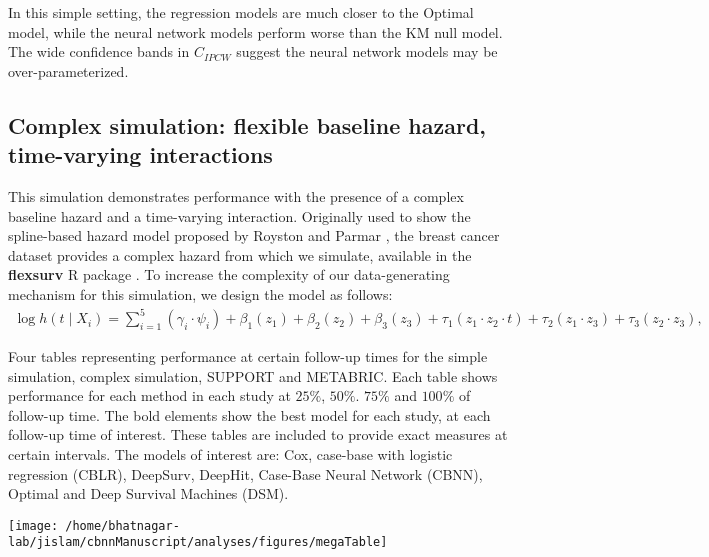 \documentclass[AMA,STIX1COL,]{WileyNJD-v2}
\begin{document}
In this simple setting, the regression models are much closer to the
Optimal model, while the neural network models perform worse than the KM
null model. The wide confidence bands in \(C_{IPCW}\) suggest the neural
network models may be over-parameterized.

\hypertarget{complex-simulation-flexible-baseline-hazard-time-varying-interactions}{%
\subsection{Complex simulation: flexible baseline hazard, time-varying
interactions}\label{complex-simulation-flexible-baseline-hazard-time-varying-interactions}}

This simulation demonstrates performance with the presence of a complex
baseline hazard and a time-varying interaction. Originally used to show
the spline-based hazard model proposed by Royston and Parmar
\citep{royston2002flexible}, the breast cancer dataset provides a
complex hazard from which we simulate, available in the
\textbf{flexsurv} R package \citep{flexsurv}. To increase the complexity
of our data-generating mechanism for this simulation, we design the
model as follows: \begin{align}
\log h(t \mid X_i) =\sum_{i=1}^{5} (\gamma_{i} \cdot \psi_{i}) + \beta_{{1}} (z_{1}) + \beta_{{2}} (z_{2})+ \beta_{{3}} (z_{3})+ \tau_{1} ( z_{1} \cdot z_{2} \cdot t)+ \tau_{2} ( z_{1} \cdot z_{3})+ \tau_{3} (z_{2} \cdot z_{3}), \nonumber
\end{align}

\FloatBarrier
\begin{table}
\caption{Four tables representing performance at certain follow-up times for the simple simulation, complex simulation, SUPPORT and METABRIC. Each table shows performance for each method in each study at $25\%$, $50\%$. $75\%$ and $100\%$ of follow-up time. The bold elements show the best model for each study, at each follow-up time of interest. These tables are included to provide exact measures at certain intervals. The models of interest are: Cox, case-base with logistic regression (CBLR), DeepSurv, DeepHit, Case-Base Neural Network (CBNN), Optimal and Deep Survival Machines (DSM).}
\label{tab:megaTable}

\begin{center}\texttt{[image: /home/bhatnagar-lab/jislam/cbnnManuscript/analyses/figures/megaTable]} \end{center}

\end{table}
\FloatBarrier
\end{document}
